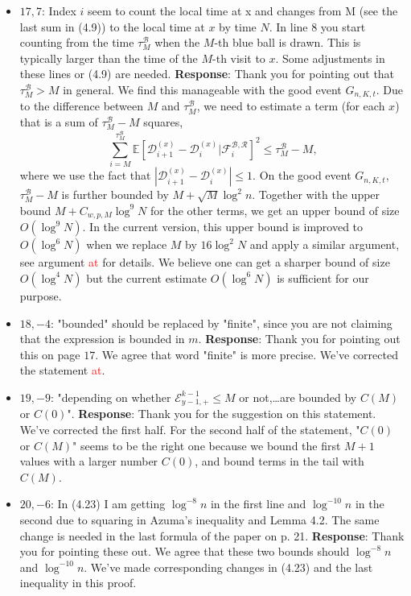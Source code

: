 \documentclass[11pt,a4paper]{article}
\numberwithin{equation}{section}
\newcommand{\abs}[1]{\left\vert #1 \right\vert}
\def\TBF#1{\textcolor{red}{#1}} %
\begin{document}
\begin{itemize}
		
		\item
		$17,7$: Index $i$ seem to count the local time at x and changes from M (see the last sum in (4.9)) to the local time at $x$ by time $N$. In line 8 you start counting from the time $\tau_M^{\mathcal{B}}$ when the $M$-th blue ball is drawn. 
		This is typically larger than the time of the $M$-th visit to $x$. Some adjustments in these lines or (4.9) are needed.
		\subitem \textbf{Response}: Thank you for pointing out that $\tau_M^{\mathcal{B}} > M $ in general. We find this manageable with the good event $G_{n,K,t}$. Due to the difference between $M$ and $\tau^{\mathcal{B}}_M$, we need to estimate a 
			term (for each $x$) that is a sum of $\tau^{\mathcal{B}}_M -M$ squares, 
			$$
			\sum_{i = M }^{\tau_M^\mathcal{B}} \mathbb{E}\left[\mathcal{D}^{(x)}_{i+1}-\mathcal{D}^{(x)}_{i} \vert \mathcal{F}_i^{\mathcal{B},\mathcal{R}} \right]^2 \leq \tau_M^\mathcal{B}- M,
			$$
			where we use the fact that $\abs{\mathcal{D}^{(x)}_{i+1}-\mathcal{D}^{(x)}_{i}} \leq 1$. On the good event $G_{n,K,t}$, $\tau_M^\mathcal{B}- M$ is further bounded by $M+\sqrt{M}\log^2 n$. Together with the upper bound $M+C_{w,p,M} \log^9 N$ for the other terms, we get an upper bound of size $O(\log^9 N)$. In the current version, this upper bound is improved to $O(\log^6 N)$ when we replace $M$ by $16\log^2 N$ and apply a similar argument, see argument \TBF{at} for details. We believe one can get a sharper bound of size $O(\log^4 N)$ but the current estimate $O(\log^6 N)$ is sufficient for our purpose.
			
		
		\item 
		$18,-4$: "bounded" should be replaced by "finite", since you are not claiming that the expression is bounded in $m$.
		\subitem \textbf{Response}:  Thank you for pointing out this on page $17$. We agree that word "finite" is more precise.  We've corrected the statement \TBF{at}. 
		
		\item 
		$19,-9$: "depending on whether $\mathcal{E}^{k-1}_{y-1,+} \leq M$ or not,\dots are bounded by $C(M)$ or $C(0)$".
		\subitem \textbf{Response}: Thank you for the suggestion on this statement. We've corrected the first half. For the second half of the statement, "$C(0)$ or $C(M)$" seems to be the right one because we bound the first $M+1$ values with a larger number $C(0)$, and bound terms in the tail with $C(M)$.
		
		\item 
		$20,-6$: In (4.23) I am getting $\log^{-8} n$ in the first line and $\log^{-10} n$ in the second due to squaring in Azuma's inequality and Lemma 4.2. The same change is needed in the last formula of the paper on p. 21.
		\subitem \textbf{Response}:  Thank you for pointing these out. We agree that these two bounds should $\log^{-8} n $ and $\log^{-10} n$. We've made corresponding changes in (4.23) and the last inequality in this proof.
		

\end{itemize}
\end{document}
